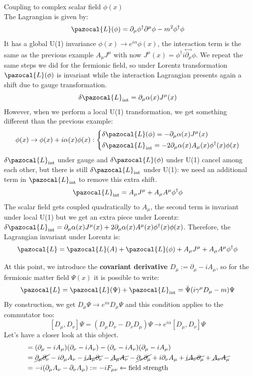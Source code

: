\documentclass[../main.tex]{subfiles}
\begin{document}
\begin{example}
Coupling to complex scalar field $\phi(x)$\\
The Lagrangian is given by:
\[
\pazocal{L}(\phi)=\partial_\mu\phi^\dagger\partial^\mu\phi-m^2\phi^\dagger\phi
\]
It has a global U(1) invariance $\phi(x)\to e^{i\alpha}\phi(x)$, the interaction term is the same as the previous example $A_\mu J^\mu$ with now $J^\mu(x)=\phi^\dagger i\overset{\leftrightarrow}{\partial_\mu}\phi$. We repeat the same steps we did for the fermionic field, so under Lorentz transformation $\pazocal{L}(\phi)$ is invariant while the interaction Lagrangian presents again a shift due to gauge transformation.
\[
\delta\pazocal{L}_{\text{int}}=\partial_\mu\alpha(x)J^\mu(x)
\]
However, when we perform a local U(1) transformation, we get something different than the previous example:
\[
\phi(x)\to\phi(x)+i\alpha(x)\phi(x):\left\{
\begin{aligned}
&\delta\pazocal{L}(\phi)=-\partial_\mu\alpha(x)J^\mu(x)\\
&\delta\pazocal{L}_{\text{int}}=-2\partial_\mu\alpha(x)A_\mu(x)\phi^\dagger(x)\phi(x)
\end{aligned}
\right.
\]
$\delta\pazocal{L}_{\text{int}}$ under gauge and $\delta\pazocal{L}(\phi)$ under U(1) cancel among each other, but there is still $\delta\pazocal{L}_{\text{int}}$ under U(1): we need an additional term in $\pazocal{L}_{\text{int}}$ to remove this extra shift.
\[
\pazocal{L}_{\text{int}}=A_\mu J^\mu+A_\mu A^\mu\phi^\dagger\phi
\]
The scalar field gets coupled quadratically to $A_\mu$, the second term is invariant under local U(1) but we get an extra piece under Lorentz: $\delta\pazocal{L}_{\text{int}}=\partial_\mu\alpha(x)J^\mu(x)+2\partial_\mu\alpha(x)A^\mu(x)\phi^\dagger(x)\phi(x)$. Therefore, the Lagrangian invariant under Lorentz is:
\[
\pazocal{L}=\pazocal{L}(A)+\pazocal{L}(\phi)+A_\mu J^\mu+A_\mu A^\mu\phi^\dagger\phi
\]
\end{example}
At this point, we introduce the \textbf{covariant derivative} $D_\mu:=\partial_\mu-iA_\mu$, so for the fermionic matter field $\Psi(x)$ it is possible to write:
\[
\pazocal{L}=\pazocal{L}(\Psi)+\pazocal{L}_{\text{int}}=\Bar{\Psi}(i\gamma^\mu D_\mu-m)\Psi
\]
By construction, we get $D_\mu\Psi\to e^{i\alpha}D_\mu\Psi$ and this condition applies to the commutator too:
\[
[D_\mu,D_\nu]\Psi=(D_\mu D_\nu-D_\nu D_\mu)\Psi\to e^{i\alpha}[D_\mu,D_\nu]\Psi
\]
Let's have a closer look at this object.
\begin{align*}
[D_\mu,D_\nu]&=(\partial_\mu-iA_\mu)(\partial_\nu-iA_\nu)-(\partial_\nu-iA_\nu)(\partial_\mu-iA_\mu)\\
&=\cancel{\partial_\mu\partial_\nu}-i\partial_\mu A_\nu-\cancel{iA_\mu\partial_\nu}-\cancel{A_\mu A_\nu}-\cancel{\partial_\nu\partial_\mu}+i\partial_\nu A_\mu+\cancel{iA_\nu\partial_\mu}+\cancel{A_\nu A_\mu}\\
&=-i(\partial_\mu A_\nu-\partial_\nu A_\mu):=-iF_{\mu\nu}\xleftarrow[]{}\text{field strength}
\end{align*}
\end{document}
